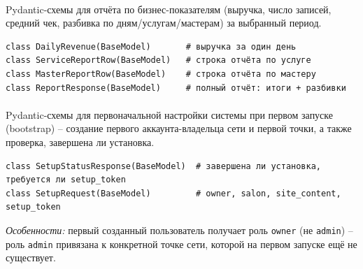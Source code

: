 \paragraph{}
Pydantic-схемы для отчёта по бизнес-показателям (выручка, число записей,
средний чек, разбивка по дням/услугам/мастерам) за выбранный период.
\begin{verbatim}
class DailyRevenue(BaseModel)       # выручка за один день
class ServiceReportRow(BaseModel)   # строка отчёта по услуге
class MasterReportRow(BaseModel)    # строка отчёта по мастеру
class ReportResponse(BaseModel)     # полный отчёт: итоги + разбивки
\end{verbatim}

\paragraph{}
Pydantic-схемы для первоначальной настройки системы при первом запуске
(bootstrap) -- создание первого аккаунта-владельца сети и первой точки, а
также проверка, завершена ли установка.
\begin{verbatim}
class SetupStatusResponse(BaseModel)  # завершена ли установка, требуется ли setup_token
class SetupRequest(BaseModel)         # owner, salon, site_content, setup_token
\end{verbatim}
\textit{Особенности:} первый созданный пользователь получает роль
\texttt{owner} (не \texttt{admin}) -- роль \texttt{admin} привязана к
конкретной точке сети, которой на первом запуске ещё не существует.

